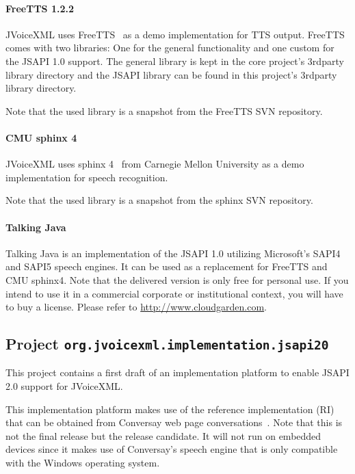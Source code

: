 \documentclass[11pt,a4paper]{article}
\begin{document}
\paragraph{FreeTTS 1.2.2}
\label{sec:freetts}

JVoiceXML uses FreeTTS~\cite{freetts} as a demo implementation for TTS output.
FreeTTS comes with two libraries: One for the general functionality
and one custom for the JSAPI 1.0 support.
The general library is kept in the core project's 3rdparty library directory
and the JSAPI library can be found in this project's 3rdparty library directory.

Note that the used library is a snapshot from the FreeTTS SVN repository.

\paragraph{CMU sphinx 4}
\label{sec:sphinx}

JVoiceXML uses sphinx 4~\cite{sphinx} from Carnegie Mellon University
as a demo implementation for speech recognition.

Note that the used library is a snapshot from the sphinx SVN repository.

\paragraph{Talking Java}

Talking Java is an implementation of the JSAPI 1.0 utilizing Microsoft's
SAPI4 and SAPI5 speech engines. It can be used as a replacement for FreeTTS
and CMU sphinx4. Note that the delivered version is only free for personal use.
If you intend to use it in a commercial corporate or institutional context, you
will have to buy a license. Please refer to \url{http://www.cloudgarden.com}.

\subsection{Project \texttt{org.jvoicexml.implementation.jsapi20}}

This project contains a first draft of an implementation platform to enable
JSAPI 2.0 support for JVoiceXML.

This implementation platform makes use of the reference implementation (RI) that
can be obtained from Conversay web page
conversations~\cite{conversay:jsr113}. Note that this is not the final release
but the release candidate. It will not run on embedded devices since it makes
use of Conversay's speech engine that is only compatible with the Windows
operating system.
\end{document}
